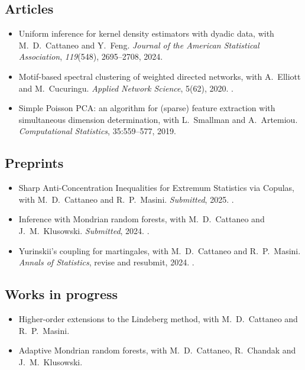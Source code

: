 \documentclass{wgu-cv}
\begin{document}
\subsection{Articles}{}
\begin{itemize}

  \item Uniform inference for kernel density estimators with dyadic data,
    with M.\ D.\ Cattaneo and Y.\ Feng.
    \emph{Journal of the American Statistical Association},
    \emph{119}(548), 2695--2708, 2024.

  \item Motif-based spectral clustering of weighted directed networks,
    with A.\ Elliott and M.\ Cucuringu.
    \emph{Applied Network Science}, 5(62), 2020.
    .

  \item Simple Poisson PCA: an algorithm for (sparse) feature extraction
    with simultaneous dimension determination,
    with L.\ Smallman and A.\ Artemiou.
    \emph{Computational Statistics}, 35:559--577, 2019.

\end{itemize}

\pagebreak

\subsection{Preprints}{}
\begin{itemize}

  \item Sharp Anti-Concentration Inequalities
    for Extremum Statistics via Copulas,
    with M.\ D.\ Cattaneo and R.\ P.\ Masini.
    \emph{Submitted}, 2025.
    .

  \item Inference with Mondrian random forests,
    with M.\ D.\ Cattaneo and J.\ M.\ Klusowski.
    \emph{Submitted}, 2024.
    .

  \item Yurinskii's coupling for martingales,
    with M.\ D.\ Cattaneo and R.\ P.\ Masini.
    \emph{Annals of Statistics}, revise and resubmit, 2024.
    .

\end{itemize}

\subsection{Works in progress}{}
\begin{itemize}

  \item Higher-order extensions to the Lindeberg method,
    with M.\ D.\ Cattaneo and R.\ P.\ Masini.

  \item Adaptive Mondrian random forests,
    with M.\ D.\ Cattaneo, R.\ Chandak and J.\ M.\ Klusowski.

\end{itemize}
\end{document}

